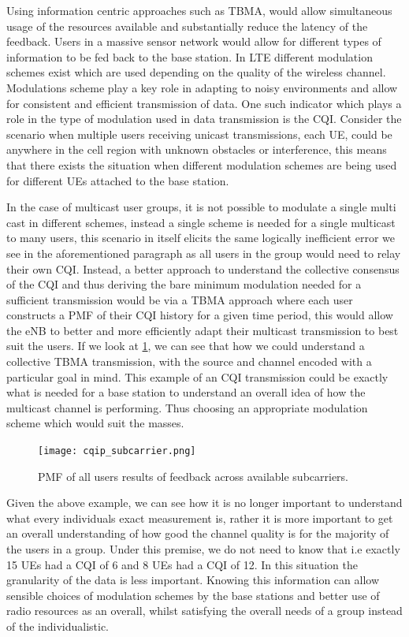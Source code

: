 \documentclass{article}
\begin{document}
Using information centric approaches such as TBMA, would allow simultaneous usage of the resources available and substantially reduce the latency of the feedback. Users in a massive sensor network would allow for different types of information to be fed back to the base station. In LTE different modulation schemes exist which are used depending on the quality of the wireless channel. Modulations scheme play a key role in adapting to noisy environments and allow for consistent and efficient transmission of data. One such indicator which plays a role in the type of modulation used in data transmission is the \ac{CQI}. Consider the scenario when multiple users receiving unicast transmissions, each UE, could be anywhere in the cell region with unknown obstacles or interference, this means that there exists the situation when different modulation schemes are being used for different UEs attached to the base station. 

In the case of multicast user groups, it is not possible to modulate a single multi cast in different schemes, instead a single scheme is needed for a single multicast to many users, this scenario in itself elicits the same logically inefficient error we see in the aforementioned paragraph as all users in the group would need to relay their own \ac{CQI}. Instead, a better approach to understand the collective consensus of the \ac{CQI} and thus deriving the bare minimum modulation needed for a sufficient transmission would be via a TBMA approach where each user constructs a PMF of their \ac{CQI} history for a given time period, this would allow the eNB to better and more efficiently adapt their multicast transmission to best suit the users. If we look at \cref{fig:pmf_subcarriers}, we can see that how we could understand a collective TBMA transmission, with the source and channel encoded with a particular goal in mind. This example of an CQI transmission could be exactly what is needed for a base station to understand an overall idea of how the multicast channel is performing. Thus choosing an appropriate modulation scheme which would suit the masses. 

\begin{figure}
    \centering
    \texttt{[image: cqip\_subcarrier.png]}
    \caption{PMF of all users results of feedback across available subcarriers.}
    \label{fig:pmf_subcarriers}
\end{figure}

Given the above example, we can see how it is no longer important to understand what every individuals exact measurement is, rather it is more important to get an overall understanding of how good the channel quality is for the majority of the users in a group. Under this premise, we do not need to know that i.e exactly 15 UEs had a CQI of 6 and 8 UEs had a CQI of 12. In this situation the granularity of the data is less important. Knowing this information can allow sensible choices of modulation schemes by the base stations and better use of radio resources as an overall, whilst satisfying the overall needs of a group instead of the individualistic. 
\end{document}
